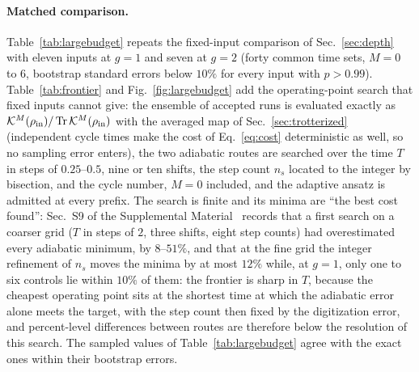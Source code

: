\documentclass[
  aps,            %
  prc,            %
  reprint,        %
  superscriptaddress,
  floatfix,
  nofootinbib
]{revtex4-2}
\newcommand{\SM}{Supplemental Material~\cite{SM}}
\begin{document}
\paragraph{Matched comparison.}
Table~\ref{tab:largebudget} repeats the fixed-input comparison of
Sec.~\ref{sec:depth} with eleven inputs at $g=1$ and seven at $g=2$ (forty
common time sets, $M=0$ to $6$, bootstrap standard errors below $10\%$ for
every input with $p>0.99$).  Table~\ref{tab:frontier} and
Fig.~\ref{fig:largebudget} add the operating-point search that fixed inputs
cannot give: the ensemble of accepted runs is evaluated exactly as
$\mathcal K^M(\rho_{\rm in})/\Tr\mathcal K^M(\rho_{\rm in})$ with the
averaged map of Sec.~\ref{sec:trotterized} (independent cycle times make
the cost of Eq.~\eqref{eq:cost} deterministic as well, so no sampling error
enters), the two adiabatic routes are searched over the time $T$ in steps
of $0.25$--$0.5$, nine or ten shifts, the step count $n_s$ located to the
integer by bisection, and the cycle number, $M=0$ included, and the
adaptive ansatz is admitted at every prefix.  The search is finite and its
minima are ``the best cost found'': Sec.~S9 of the \SM{} records that a
first search on a coarser grid ($T$ in steps of $2$, three shifts, eight
step counts) had overestimated every adiabatic minimum, by $8$--$51\%$,
and that at the fine grid the integer refinement of $n_s$ moves the minima
by at most $12\%$ while, at $g=1$, only one to six controls lie within
$10\%$ of them: the frontier is sharp in $T$, because the cheapest
operating point sits at the shortest time at which the adiabatic error
alone meets the target, with the step count then fixed by the
digitization error, and percent-level differences between routes are
therefore below the resolution of this search.  The sampled values of
Table~\ref{tab:largebudget} agree with the exact ones within their
bootstrap errors.
\end{document}
